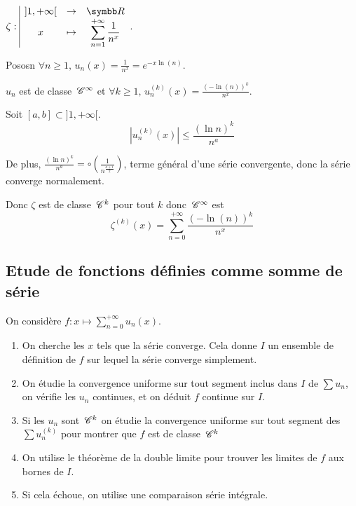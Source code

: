 \begin{exemple}
    $\fonction \zeta {]1, + \infty[}{\R} x {\sum_{n = 1}^{+ \infty} \frac 1 {n^x}}$.

    Pososn $\forall n \geqslant 1, \, u_n(x) = \frac 1 {n^x} = e^{-x \ln(n)}$.

    $u_n$ est de classe $\,\mathscr C^{\infty}$ et $\forall k \geqslant 1, \, u_n^{(k)}(x) = \frac{(- \ln(n))^k}{n^x}$. 

    Soit $[a, b] \subset ]1, +\infty[$.
    $$\left| u_n^{(k)}(x) \right| \leqslant \frac{(\ln n )^k}{n^a}$$

    De plus, $\displaystyle \frac{(\ln n)^k}{n^a} = \circ \left( \frac 1 {n^{\frac{a + 1}{2}}} \right)$, terme 
    général d'une série convergente, donc la série converge normalement. 

    Donc $\zeta$ est de classe $\,\mathscr C^{k}$ pour tout $k$ donc $\,\mathscr C^{\infty}$ est 
    $$\zeta^{(k)}(x) = \sum_{n = 0}^{+ \infty} \frac{(- \ln(n))^k}{n^x}$$
\end{exemple}

\subsection{Etude de fonctions définies comme somme de série }


On considère $f : \displaystyle x \mapsto \sum_{n = 0}^{+ \infty} u_n(x)$. 

\begin{enumerate}
    \item On cherche les $x$ tels que la série converge. Cela donne $I$ un ensemble de définition 
    de $f$ sur lequel la série converge simplement.
    \item On étudie la convergence uniforme sur tout segment inclus dans $I$ de $\sum u_n$, on vérifie 
    les $u_n$ continues, et on déduit $f$ continue sur $I$.
    \item Si les $u_n$ sont $\,\mathscr C^{k}$ on étudie la convergence uniforme sur tout segment des 
    $\sum u_n^{(k)}$ pour montrer que $f$ est de classe $\,\mathscr C^{k}$ 
    \item On utilise le théorème de la double limite pour trouver les limites de $f$ aux bornes 
    de $I$. 
    \item Si cela échoue, on utilise une comparaison série intégrale. 
\end{enumerate}

